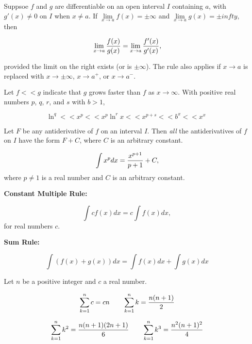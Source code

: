 Suppsoe $f$ and $g$ are differentiable on an open interval $I$
containing $a$, with $g'(x) \ne 0$ on $I$ when $x \ne a$. If
$\lim\limits_{x \to a} f(x) = \pm \infty$ and
$\lim\limits_{x \to a} g(x) = \pm infty$, then

$$\
\lim_{x \to a} {f(x) \over g(x)} =
\lim_{x \to a} {f'(x) \over g'(x)},
$$

provided the limit on the right exists (or is $\pm \infty$).
The rule also applies if $x \to a$ is replaced with $x \to \pm \infty$,
$x \to a^+$, or $x \to a^-$.
\endthm

Let $f << g$ indicate that $g$ grows faster than $f$ as
$x \to \infty$. With positive real numbers $p$, $q$, $r$, and $s$
with $b > 1$,

$$
\ln^q << x^p << x^p\ln^r x << x^{p + s} << b^x << x^x
$$

\endthm

Let $F$ be any antiderivative of $f$ on an interval $I$.
Then {\it all} the antiderivatives of $f$ on $I$ have the form
$F + C$, where $C$ is an arbitrary constant.
\endthm

$$\
\int x^p dx = {x^{p + 1} \over p + 1} + C,
$$
where $p \ne 1$ is a real number and $C$ is an arbitrary
constant.

\endthm

{\par \bf Constant Multiple Rule:}
$$\
\int cf(x)dx = c\int f(x) dx,
$$ for real numbers $c$.

{\par \bf Sum Rule:}

$$\
\int (f(x) + g(x)) dx = \int f(x)dx +
\int g(x)dx
$$
\endthm

Let $n$ be a positive integer and $c$ a real number.

$$\
\sum^{n}_{k = 1}c = cn \qquad
\sum^{n}_{k = 1}k = {n(n + 1) \over 2}
$$

$$\
\sum^{n}_{k = 1}k^2 = {n(n + 1)(2n + 1) \over 6} \qquad
\sum^{n}_{k = 1}k^3 = {n^2(n + 1)^2 \over 4}
$$
\endthm

\bye
